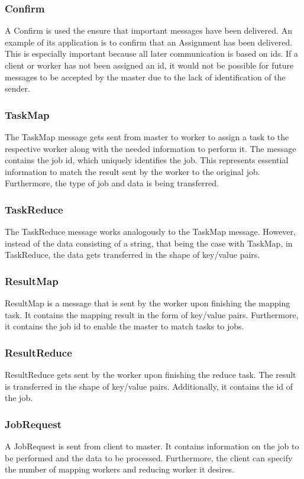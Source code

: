 \documentclass[12pt, letterpaper]{article}
\begin{document}
\subsubsection{Confirm}
A Confirm is used the ensure that important messages have been delivered. An example of its application is to confirm that an Assignment has been delivered. This is especially important because all later communication is based on ids. If a client or worker has not been assigned an id, it would not be possible for future messages to be accepted by the master due to the lack of identification of the sender. 

\subsubsection{TaskMap}
The TaskMap message gets sent from master to worker to assign a task to the respective worker along with the needed information to perform it. The message contains the job id, which uniquely identifies the job. This represents essential information to match the result sent by the worker to the original job. Furthermore, the type of job and data is being transferred.

\subsubsection{TaskReduce}
The TaskReduce message works analogously to the TaskMap message. However, instead of the data consisting of a string, that being the case with TaskMap, in TaskReduce, the data gets transferred in the shape of key/value pairs. 

\subsubsection{ResultMap}
ResultMap is a message that is sent by the worker upon finishing the mapping task. It contains the mapping result in the form of key/value pairs. Furthermore, it contains the job id to enable the master to match tasks to jobs.

\subsubsection{ResultReduce}
ResultReduce gets sent by the worker upon finishing the reduce task. The result is transferred in the shape of key/value pairs. Additionally, it contains the id of the job. 

\subsubsection{JobRequest}
A JobRequest is sent from client to master. It contains information on the job to be performed and the data to be processed. Furthermore, the client can specify the number of mapping workers and reducing worker it desires. 
\end{document}
